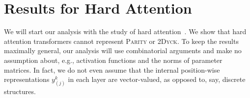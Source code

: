 \documentclass[11pt,a4paper]{article}
\begin{document}






\section{Results for Hard Attention}\label{sec:hard}

We will start our analysis with the study of hard attention~\cite{perez2019turing}.
We show that hard attention transformers cannot represent \textsc{Parity} or \textsc{2Dyck}. %
To keep the results maximally general, our analysis will use combinatorial arguments and make no assumption about, e.g., activation functions and the norms of parameter matrices.
In fact, we do not even assume that the internal position-wise representations $y_{(j)}^k$ in each layer are vector-valued, as opposed to, say, discrete structures.



\end{document}
